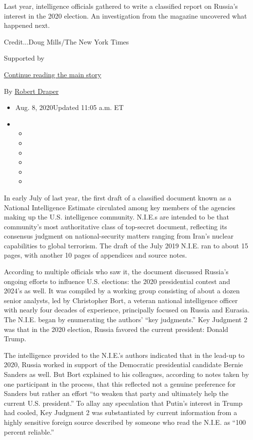 Last year, intelligence officials gathered to write a classified report
on Russia's interest in the 2020 election. An investigation from the
magazine uncovered what happened next.

Credit...Doug Mills/The New York Times

Supported by

\protect\hyperlink{after-sponsor}{Continue reading the main story}

By \href{https://www.nytimes.com/by/robert-draper}{Robert Draper}

\begin{itemize}
\item
  Aug. 8, 2020Updated 11:05 a.m. ET
\item
  \begin{itemize}
  \item
  \item
  \item
  \item
  \item
  \item
  \end{itemize}
\end{itemize}

In early July of last year, the first draft of a classified document
known as a National Intelligence Estimate circulated among key members
of the agencies making up the U.S. intelligence community. N.I.E.s are
intended to be that community's most authoritative class of top-secret
document, reflecting its consensus judgment on national-security matters
ranging from Iran's nuclear capabilities to global terrorism. The draft
of the July 2019 N.I.E. ran to about 15 pages, with another 10 pages of
appendices and source notes.

According to multiple officials who saw it, the document discussed
Russia's ongoing efforts to influence U.S. elections: the 2020
presidential contest and 2024's as well. It was compiled by a working
group consisting of about a dozen senior analysts, led by Christopher
Bort, a veteran national intelligence officer with nearly four decades
of experience, principally focused on Russia and Eurasia. The N.I.E.
began by enumerating the authors' ``key judgments.'' Key Judgment 2 was
that in the 2020 election, Russia favored the current president: Donald
Trump.

The intelligence provided to the N.I.E.'s authors indicated that in the
lead-up to 2020, Russia worked in support of the Democratic presidential
candidate Bernie Sanders as well. But Bort explained to his colleagues,
according to notes taken by one participant in the process, that this
reflected not a genuine preference for Sanders but rather an effort ``to
weaken that party and ultimately help the current U.S. president.'' To
allay any speculation that Putin's interest in Trump had cooled, Key
Judgment 2 was substantiated by current information from a highly
sensitive foreign source described by someone who read the N.I.E. as
``100 percent reliable.''

